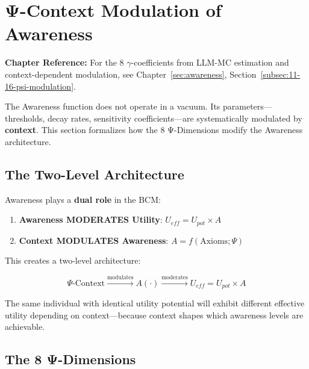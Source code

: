 
\section{Ψ-Context Modulation of Awareness}
\label{sec:psi-modulation}

\begin{cross-reference}
\textbf{Chapter Reference:} For the 8 $\gamma$-coefficients from LLM-MC estimation 
and context-dependent modulation, see Chapter~\ref{sec:awareness}, 
Section~\ref{subsec:11-16-psi-modulation}.
\end{cross-reference}

The Awareness function does not operate in a vacuum. Its parameters---thresholds, decay rates, sensitivity coefficients---are systematically modulated by \textbf{context}. This section formalizes how the 8 Ψ-Dimensions modify the Awareness architecture.

\subsection{The Two-Level Architecture}

Awareness plays a \textbf{dual role} in the BCM:

\begin{enumerate}
    \item \textbf{Awareness MODERATES Utility}: $U_{eff} = U_{pot} \times A$
    \item \textbf{Context MODULATES Awareness}: $A = f(\text{Axioms}; \Psi)$
\end{enumerate}

This creates a two-level architecture:

\begin{equation}
\boxed{
\Psi\text{-Context} \xrightarrow{\text{modulates}} A(\cdot) \xrightarrow{\text{moderates}} U_{eff} = U_{pot} \times A
}
\end{equation}

The same individual with identical utility potential will exhibit different effective utility depending on context---because context shapes which awareness levels are achievable.

\subsection{The 8 Ψ-Dimensions}


